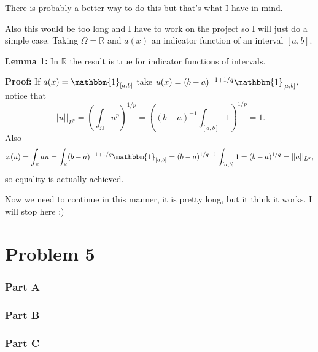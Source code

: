 \documentclass{article}
\begin{document}
There is probably a better way to do this but that's what I have in mind.

Also this would be too long and I have to work on the project so I will just do
a simple case. Taking $\Omega = \mathbb{R}$ and $a(x)$ an indicator function of
an interval $[a,b]$.

\textbf{Lemma 1:} In $\mathbb{R}$ the result is true for indicator functions of
intervals.

\textbf{Proof:} If $a(x)=\mathbbm{1}_{[a,b]}$ take
$u(x)=(b-a)^{-1+1/q}\mathbbm{1}_{[a,b]}$, notice that
\[
	||u||_{L^p}=\left(\int_\Omega u^{p}\right)^{1/p}=\left(
	(b-a)^{-1}\int_{[a,b]} 1 \right)^{1/p} =1.
\]
Also
\[
	\varphi(u)= \int_\mathbb{R} au = \int_\mathbb{R} (b-a)^{-1+1/q}
	\mathbbm{1}_{[a,b]} =(b-a)^{1/q-1}\int_{[a,b]}1=(b-a)^{1/q}=||a||_{L^q},
\]
so equality is actually achieved.

Now we need to continue in this manner, it is pretty long, but it think it
works. I will stop here :)
\section*{Problem 5}
\subsubsection*{Part A}
\subsubsection*{Part B}
\subsubsection*{Part C}
\end{document}
